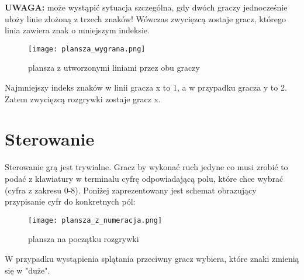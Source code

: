 \documentclass{article}
\begin{document}
\textbf{UWAGA:} może wystąpić sytuacja szczególna, gdy dwóch graczy jednocześnie ułoży linie złożoną z trzech znaków! Wówczas zwycięzcą zostaje gracz, którego linia zawiera znak o mniejszym indeksie.

\begin{figure}[h]
    \centering
    \texttt{[image: plansza\_wygrana.png]}
    \caption{plansza z utworzonymi liniami przez obu graczy}
\end{figure}
Najmniejszy indeks znaków w linii gracza x to 1, a w przypadku gracza y to 2. Zatem zwycięzcą rozgrywki zostaje gracz x.

\section{Sterowanie}
Sterowanie grą jest trywialne. Gracz by wykonać ruch jedyne co musi zrobić to podać z klawiatury w terminalu cyfrę odpowiadającą polu, które chce wybrać (cyfra z zakresu 0-8). Poniżej zaprezentowany jest schemat obrazujący przypisanie cyfr do konkretnych pól:
\begin{figure}[h]
    \centering
    \texttt{[image: plansza\_z\_numeracja.png]}

    \caption{plansza na początku rozgrywki}
\end{figure}

W przypadku wystąpienia splątania przeciwny gracz wybiera, które znaki zmienią się w "duże".

\newpage
\end{document}
